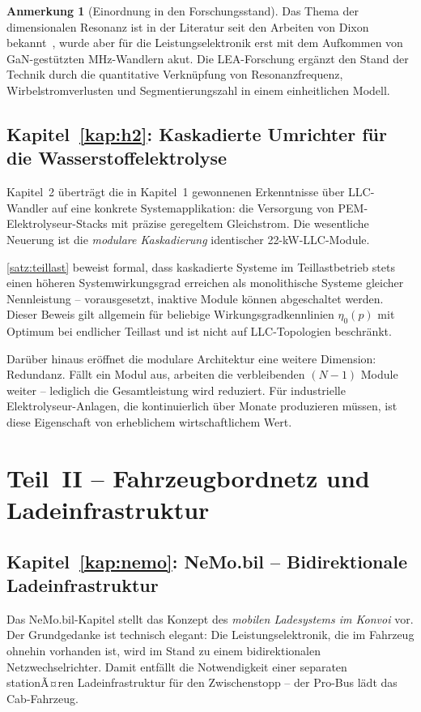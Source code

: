﻿\documentclass[a4paper,12pt,openany,oneside]{book}
\newcommand{\abschnitt}[1]{\section{#1}}
\newcommand{\unterabschnitt}[1]{\subsection{#1}}
\theoremstyle{definition}
\newtheorem{bemerkung}{Anmerkung}[chapter]
\begin{document}
\begin{bemerkung}[Einordnung in den Forschungsstand]
  Das Thema der dimensionalen Resonanz ist in der Literatur seit den Arbeiten von Dixon
  bekannt~\cite{Dixon2001}, wurde aber f\"ur die Leistungselektronik erst mit dem Aufkommen
  von GaN-gest\"utzten MHz-Wandlern akut. Die LEA-Forschung erg\"anzt den Stand der Technik
  durch die quantitative Verkn\"upfung von Resonanzfrequenz, Wirbelstromverlusten und
  Segmentierungszahl in einem einheitlichen Modell.
\end{bemerkung}

\unterabschnitt{Kapitel~\ref{kap:h2}: Kaskadierte Umrichter f\"ur die Wasserstoffelektrolyse}

Kapitel~2 \"ubertr\"agt die in Kapitel~1 gewonnenen Erkenntnisse \"uber LLC-Wandler auf
eine konkrete Systemapplikation: die Versorgung von PEM-Elektrolyseur-Stacks mit pr\"azise
geregeltem Gleichstrom. Die wesentliche Neuerung ist die \emph{modulare Kaskadierung}
identischer 22-kW-LLC-Module.

\autoref{satz:teillast} beweist formal, dass kaskadierte Systeme im Teillastbetrieb
stets einen h\"oheren Systemwirkungsgrad erreichen als monolithische Systeme gleicher
Nennleistung -- vorausgesetzt, inaktive Module k\"onnen abgeschaltet werden. Dieser
Beweis gilt allgemein f\"ur beliebige Wirkungsgradkennlinien $\eta_0(p)$ mit
Optimum bei endlicher Teillast und ist nicht auf LLC-Topologien beschr\"ankt.

Dar\"uber hinaus er\"offnet die modulare Architektur eine weitere Dimension: Redundanz.
F\"allt ein Modul aus, arbeiten die verbleibenden $(N-1)$ Module weiter -- lediglich
die Gesamtleistung wird reduziert. F\"ur industrielle Elektrolyseur-Anlagen, die
kontinuierlich \"uber Monate produzieren m\"ussen, ist diese Eigenschaft von
erheblichem wirtschaftlichem Wert.

\abschnitt{Teil~II -- Fahrzeugbordnetz und Ladeinfrastruktur}

\unterabschnitt{Kapitel~\ref{kap:nemo}: NeMo.bil -- Bidirektionale Ladeinfrastruktur}

Das NeMo.bil-Kapitel stellt das Konzept des \emph{mobilen Ladesystems im Konvoi} vor.
Der Grundgedanke ist technisch elegant: Die Leistungselektronik, die im Fahrzeug
ohnehin vorhanden ist, wird im Stand zu einem bidirektionalen Netzwechselrichter.
Damit entf\"allt die Notwendigkeit einer separaten stationÃ¤ren Ladeinfrastruktur f\"ur
den Zwischenstopp -- der Pro-Bus l\"adt das Cab-Fahrzeug.
\end{document}
